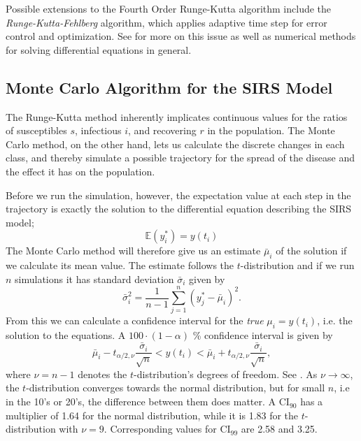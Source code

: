 \documentclass[]{article}
\begin{document}
Possible extensions to the Fourth Order Runge-Kutta algorithm include the \textit{Runge-Kutta-Fehlberg} algorithm, which applies adaptive time step for error control and optimization. See \cite{fys4150-notes} for more on this issue as well as numerical methods for solving differential equations in general.

\subsection{Monte Carlo Algorithm for the SIRS Model} \label{sec:monte-carlo}
The Runge-Kutta method inherently implicates continuous values for the ratios of susceptibles $s$, infectious $i$, and recovering $r$ in the population. The Monte Carlo method, on the other hand, lets us calculate the discrete changes in each class, and thereby simulate a possible trajectory for the spread of the disease and the effect it has on the population. 

Before we run the simulation, however, the expectation value at each step in the trajectory is exactly the solution to the differential equation describing the SIRS model;
\begin{equation}
	\mathbb{E}(y^*_i) = y(t_i)
\end{equation}
The Monte Carlo method will therefore give us an estimate $\bar{\mu}_i$ of the solution if we calculate its mean value. The estimate follows the $t$-distribution and if we run $n$ simulations it has standard deviation $\bar{\sigma}_i$ given by
\begin{equation}
	\bar{\sigma}_i^2 = \frac{1}{n-1} \sum_{j=1}^{n} (y^*_j - \bar{\mu}_i)^2.
\end{equation}
From this we can calculate a confidence interval for the \textit{true} $\mu_i = y(t_i)$, i.e. the solution to the equations. A $100 \cdot (1-\alpha)$ \% confidence interval is given by
\begin{equation}
	\bar{\mu}_i - t_{\alpha/2, \nu} \frac{\bar{\sigma}_i}{\sqrt{n}} < y(t_i) < \bar{\mu}_i + t_{\alpha/2, \nu} \frac{\bar{\sigma}_i}{\sqrt{n}},
\end{equation}
where $\nu = n-1$ denotes the $t$-distribution's degrees of freedom. See \cite{devore2012}. As $\nu \rightarrow \infty$, the $t$-distribution converges towards the normal distribution, but for small $n$, i.e in the 10's or 20's, the difference between them does matter. A CI$_{90}$ has a multiplier of 1.64 for the normal distribution, while it is 1.83 for the $t$-distribution with $\nu=9$. Corresponding values for CI$_{99}$ are 2.58 and 3.25.
\end{document}
